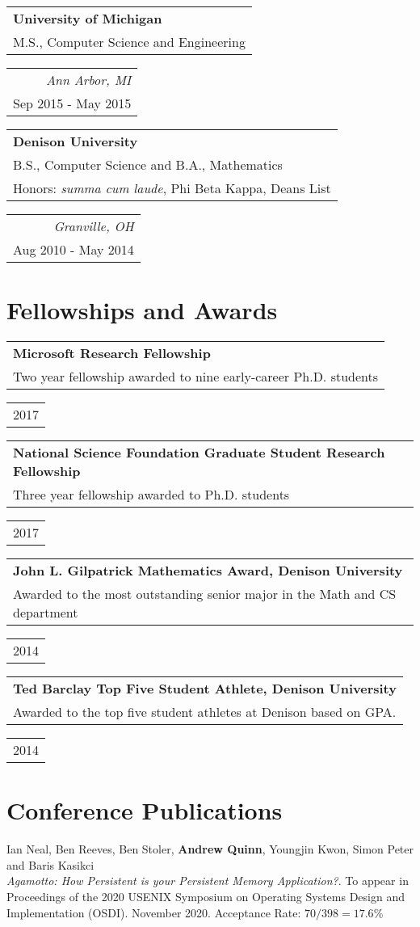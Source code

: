 \documentclass[letterpaper,10pt]{article}
\newcommand{\reitem}[2]{
  \begin{tabular}{l}
    #2
  \end{tabular}
\hfill
\begin{tabular}{r}
  #1
\end{tabular}
}
\newcommand{\quadItem}[4]{\reitem{\emph{#1}\\#2}{\textbf{#3}\\#4}}
\newcommand{\award}[4]{\reitem{#1\\#2}{\textbf{#3}\\#4}}
\newcommand{\paper}[3]{#1\\#2 #3}
\newcommand{\desc}[1]{\hspace*{.5em}#1}
\begin{document}
\quadItem{Ann Arbor, MI}{Sep 2015 - May 2015}{University of Michigan}{M.S., Computer Science and Engineering}

\quadItem{Granville, OH}{Aug 2010 - May 2014}{Denison University}{B.S.,
  Computer Science and B.A., Mathematics\\ Honors: \textit{summa cum
    laude}, Phi Beta Kappa, Deans List}


\section{Fellowships and Awards}

\award{2017}{}{Microsoft Research Fellowship}{Two year fellowship awarded to nine early-career Ph.D. students}

\award{2017}{}{National Science Foundation Graduate Student Research Fellowship}{Three year fellowship awarded to Ph.D. students}

\award{2014}{}{John L. Gilpatrick Mathematics Award, Denison University}{Awarded to the most outstanding senior major in the Math and CS department}

\award{2014}{}{Ted Barclay Top Five Student Athlete, Denison University}{Awarded to the top five student athletes at Denison based on GPA.}


\section{Conference Publications}
\paper{Ian Neal, Ben Reeves, Ben Stoler, \textbf{Andrew Quinn},
  Youngjin Kwon, Simon Peter and Baris Kasikci}{\emph{Agamotto: How
    Persistent is your Persistent Memory Application?}.  To appear in
  Proceedings of the 2020 USENIX Symposium on Operating Systems Design
  and Implementation (OSDI).  November 2020.}{Acceptance Rate: $70/398=17.6\%$}
\end{document}
